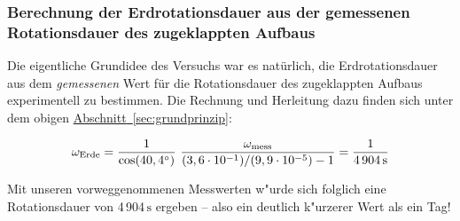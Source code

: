 \documentclass[11pt]{scrartcl}
\newcommand{\unit}[1]{\ensuremath{\,\mathrm{#1}}} %
\newcommand{\degr}{\ensuremath{^\circ}}
\newcommand{\ee}[1]{\ensuremath{\cdot 10^{#1}}}
\newcommand{\ltext}[1]{\ensuremath{_{\textnormal{#1}}}}
\newcommand{\hypref}[2]{\hyperref[#2]{{#1}~\ref{#2}}}
\begin{document}
\subsubsection{Berechnung der Erdrotationsdauer aus der gemessenen Rotationsdauer des zugeklappten Aufbaus}

Die eigentliche Grundidee des Versuchs war es nat\"urlich, die Erdrotationsdauer aus dem \textit{gemessenen} Wert f\"ur die Rotationsdauer des zugeklappten Aufbaus experimentell zu bestimmen. Die Rechnung und Herleitung dazu finden sich unter dem obigen \hypref{Abschnitt}{sec:grundprinzip}:

\begin{equation}
\omega\ltext{Erde} = 
\frac{1}{\cos(40,4\degr)}\ 
\frac{\omega\ltext{mess}}{(3,6\ee{-1}) / (9,9\ee{-5}) - 1}
= \frac{1}{4\,904\unit{s}} %
\end{equation}

Mit unseren vorweggenommenen Messwerten w"urde sich folglich eine Rotationsdauer von 4\,904\unit{s} ergeben -- also ein deutlich k"urzerer Wert als ein Tag!
\end{document}

